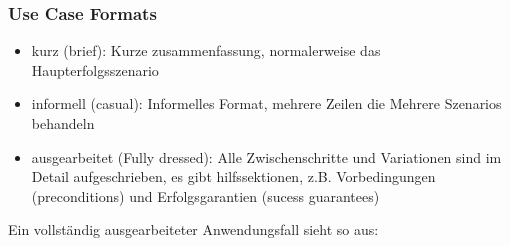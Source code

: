 \documentclass[ngerman]{tuda_summary}
\begin{document}
\subsubsection{Use Case Formats}
\begin{itemize}
    \item kurz (brief): Kurze zusammenfassung, normalerweise das Haupterfolgsszenario
    \item informell (casual): Informelles Format, mehrere Zeilen die Mehrere Szenarios behandeln
    \item ausgearbeitet (Fully dressed): Alle Zwischenschritte und Variationen sind im Detail aufgeschrieben, es gibt hilfssektionen, z.B. Vorbedingungen (preconditions) und Erfolgsgarantien (sucess guarantees)
\end{itemize}
Ein vollständig ausgearbeiteter Anwendungsfall sieht so aus:
\end{document}
